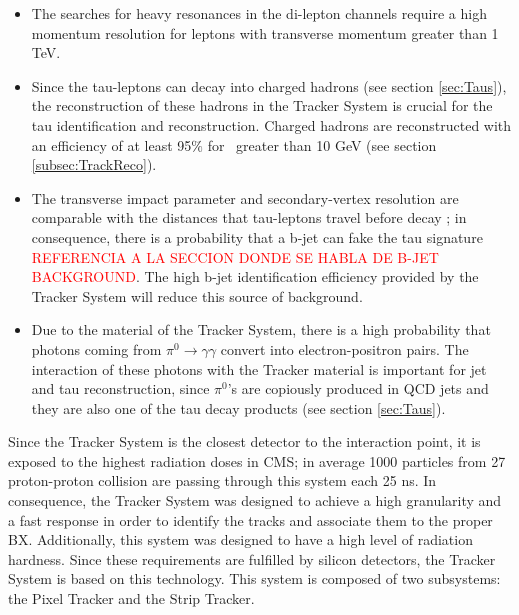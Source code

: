 \begin{itemize}
 \item The searches for heavy resonances in the di-lepton channels require a 
 high momentum resolution for leptons with transverse momentum greater than 1 TeV. 
 \item Since the tau-leptons can decay into charged hadrons (see section \ref{sec:Taus}), the 
 reconstruction of these hadrons in the Tracker System is crucial
 for the tau identification and reconstruction. Charged
 hadrons are reconstructed with an efficiency of at least 95$\%$ for \pt~greater than
 10 GeV (see section \ref{subsec:TrackReco})\cite{TrackerPerformace}.
 \item The transverse impact parameter and secondary-vertex resolution are comparable with 
 the distances that tau-leptons travel before decay \cite{TauReconstructionCMSRun1}; 
 in consequence, there is a probability that a b-jet can fake 
 the tau signature \textcolor{red}{REFERENCIA A LA SECCION DONDE SE HABLA DE B-JET BACKGROUND}. The 
 high b-jet identification efficiency provided by the Tracker System will reduce this source of background.
 \item Due to the material of the Tracker System, there is a high probability 
 that photons coming from $\pi^{0} \rightarrow \gamma\gamma$ convert into electron-positron 
 pairs. The interaction of these photons with the Tracker material is important for jet and tau reconstruction,
 since $\pi^{0}$'s are copiously produced in QCD jets and they are also one of the tau decay 
 products (see section \ref{sec:Taus}).
 
\end{itemize}

\noindent Since the Tracker System is the closest detector to the interaction point, it is exposed 
to the highest radiation doses in CMS; in average 1000 particles from 27 proton-proton collision 
are passing through this system each 25 ns. In consequence, the Tracker System was designed to achieve a high granularity 
and a fast response in order to identify the tracks and associate them 
to the proper BX. Additionally, this system was designed to have a high level of radiation hardness. Since 
these requirements are fulfilled by silicon detectors, the Tracker System is based on 
this technology. This system is composed of two subsystems: the Pixel Tracker and the Strip Tracker. \\ 

